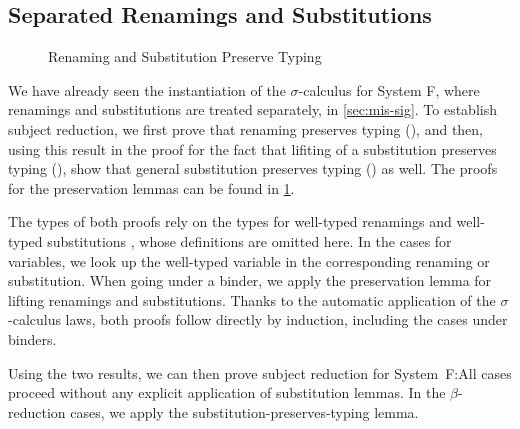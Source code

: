 \documentclass[screen,nonacm]{acmart}
\begin{document}
\noindent\begin{minipage}[t]{0.48\linewidth}
      \raggedright{}
      \EUpArrow{}
\end{minipage}
\begin{minipage}[t]{0.48\linewidth}
      \raggedright{}
      \ETypeOf{}
\end{minipage}

\subsection*{Separated Renamings and Substitutions}
\begin{figure}[!t]
      \centering
      \begin{minipage}[t]{0.48\linewidth}
            \raggedright{}
            \ERPT{}
      \end{minipage}
      \begin{minipage}[t]{0.48\linewidth}
            \raggedright{}
            \ESPT{}
      \end{minipage}
      \caption{Renaming and Substitution Preserve Typing}\label{fig:ext-rst}
\end{figure}

We have already seen the instantiation of the $σ$-calculus for System F, where
renamings and substitutions are treated separately, in \cref{sec:mis-sig}. To
establish subject reduction, we first prove that renaming preserves typing
(), and then, using this result in the proof for the fact
that lifiting of a substitution preserves typing (), show
that general substitution preserves typing () as well.
The proofs for the preservation lemmas can be found in \cref{fig:ext-rst}.

The types of both proofs rely on the types for well-typed renamings \EWTR{} and
well-typed substitutions \EWTS{}, whose definitions are omitted here. In the
cases for variables, we look up the well-typed variable in the corresponding
renaming or substitution. When going under a binder, we apply the preservation
lemma for lifting renamings and substitutions. Thanks to the automatic
application of the $σ$-calculus laws, both proofs follow directly by induction,
including the cases under binders.

Using the two results, we can then prove subject reduction for
System~F:\ESR{}All cases proceed without any explicit application of
substitution lemmas. In the $β$-reduction cases, we apply the
substitution-preserves-typing lemma.
\end{document}
